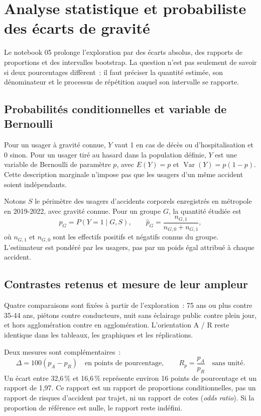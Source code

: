 \chapter[Analyse statistique et probabiliste des écarts de gravité]{Analyse statistique et probabiliste\\des écarts de gravité}
\label{chap:statistiques}

Le notebook 05 prolonge l'exploration par des écarts absolus, des rapports de proportions
et des intervalles bootstrap. La question n'est pas seulement de savoir si deux
pourcentages diffèrent~: il faut préciser la quantité estimée, son dénominateur et le
processus de répétition auquel son intervalle se rapporte.

\section{Probabilités conditionnelles et variable de Bernoulli}
Pour un usager à gravité connue, $Y$ vaut 1 en cas de décès ou d'hospitalisation et 0
sinon. Pour un usager tiré au hasard dans la population définie, $Y$ est une variable
de Bernoulli de paramètre $p$, avec $E(Y)=p$ et $\operatorname{Var}(Y)=p(1-p)$.
Cette description marginale n'impose pas que les usagers d'un même accident soient
indépendants.

Notons $S$ le périmètre des usagers d'accidents corporels enregistrés en métropole en
2019-2022, avec gravité connue. Pour un groupe $G$, la quantité étudiée est
\begin{equation}
 p_G=P(Y=1\mid G,S),\qquad
 \widehat p_G=\frac{n_{G,1}}{n_{G,0}+n_{G,1}},
 \label{eq:proportion}
\end{equation}
où $n_{G,1}$ et $n_{G,0}$ sont les effectifs positifs et négatifs connus du groupe.
L'estimateur est pondéré par les usagers, pas par un poids égal attribué à chaque accident.

\section{Contrastes retenus et mesure de leur ampleur}
Quatre comparaisons sont fixées à partir de l'exploration~: 75 ans ou plus contre
35-44 ans, piétons contre conducteurs, nuit sans éclairage public contre plein jour,
et hors agglomération contre en agglomération. L'orientation A / R reste identique
dans les tableaux, les graphiques et les réplications.

Deux mesures sont complémentaires~:
\begin{equation}
 \Delta=100(p_A-p_R)\quad\text{en points de pourcentage},\qquad
 R_p=\frac{p_A}{p_R}\quad\text{sans unité}.
 \label{eq:contrastes}
\end{equation}
Un écart entre 32,6\,\% et 16,6\,\% représente environ 16 points de pourcentage et un
rapport de 1,97. Ce rapport est un rapport de proportions conditionnelles, pas un
rapport de risques d'accident par trajet, ni un rapport de cotes (\textit{odds ratio}).
Si la proportion de référence est nulle, le rapport reste indéfini.


